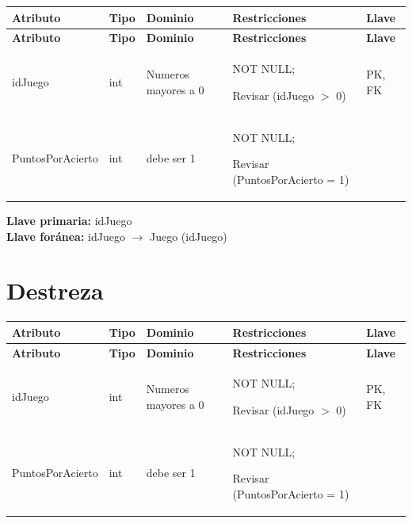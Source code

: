 \documentclass[12pt]{article}
\begin{document}
\begin{longtable}{p{3.2cm} p{2.2cm} p{4.8cm} p{4.2cm} p{1.2cm}}
\label{tab:disparos}\\
\toprule
\textbf{Atributo} & \textbf{Tipo} & \textbf{Dominio} & \textbf{Restricciones} & \textbf{Llave} \\
\midrule
\endfirsthead

\toprule
\textbf{Atributo} & \textbf{Tipo} & \textbf{Dominio} & \textbf{Restricciones} & \textbf{Llave} \\
\midrule
\endhead

\bottomrule
\endfoot

idJuego 
& int 
& Numeros mayores a 0
& NOT NULL;

Revisar (idJuego $>$ 0)
& PK, FK \\

PuntosPorAcierto 
& int
& debe ser 1
& NOT NULL;

Revisar (PuntosPorAcierto = 1)
& \\

\end{longtable}

\vspace{2pt}
\textbf{Llave primaria:} idJuego\\
\textbf{Llave foránea:} idJuego $\rightarrow$ Juego (idJuego)\\


\section*{Destreza}

\begin{longtable}{p{3.2cm} p{2.2cm} p{4.8cm} p{4.2cm} p{1.2cm}}
\label{tab:destreza}\\
\toprule
\textbf{Atributo} & \textbf{Tipo} & \textbf{Dominio} & \textbf{Restricciones} & \textbf{Llave} \\
\midrule
\endfirsthead

\toprule
\textbf{Atributo} & \textbf{Tipo} & \textbf{Dominio} & \textbf{Restricciones} & \textbf{Llave} \\
\midrule
\endhead

\bottomrule
\endfoot

idJuego 
& int 
& Numeros mayores a 0
& NOT NULL;

Revisar (idJuego $>$ 0)
& PK, FK \\

PuntosPorAcierto 
& int
& debe ser 1
& NOT NULL;

Revisar (PuntosPorAcierto = 1)
& \\

\end{longtable}
\end{document}
